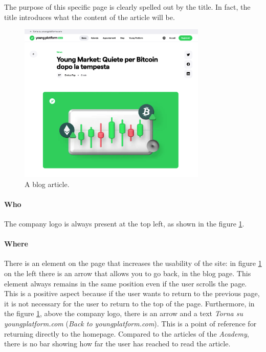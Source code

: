 The purpose of this specific page is clearly spelled out by the title. In 
fact, the title introduces what the content of the article will be.

\begin{figure}[H]
  \centering
  \includegraphics[width=0.80\textwidth]{res/images/internal-pages/blog/blog-3.png}
  \caption{A blog article.}
  \label{fig:blog-3}
\end{figure}

\paragraph{Who}

The company logo is always present at the top left, as shown in the figure 
\ref{fig:blog-3}.

\paragraph{Where}

There is an element on the page that increases the usability of the site: 
in figure \ref{fig:blog-3} on the left there is an arrow that allows you 
to go back, in the blog page. This element always remains in the same 
position even if the user scrolls the page. This is a positive aspect 
because if the user wants to return to the previous page, it is not 
necessary for the user to return to the top of the page. Furthermore, 
in the figure \ref{fig:blog-3}, above the company logo, there is an 
arrow and a text \textit{Torna su youngplatform.com} (\textit{Back to 
youngplatform.com}). This is a point of reference for returning directly 
to the homepage. Compared to the articles of the \textit{Academy}, there 
is no bar showing how far the user has reached to read the article.

